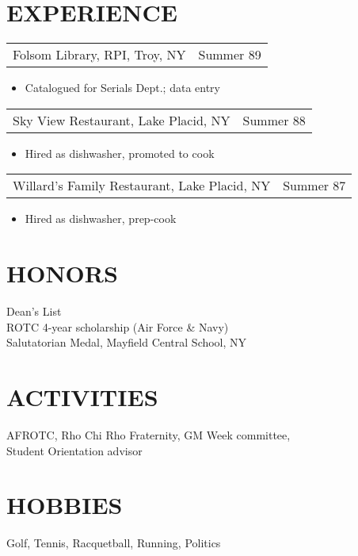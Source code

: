 \documentclass[margin]{res}
\begin{document}
\begin{resume}
\section{EXPERIENCE}      
                  \begin{tabular}{p{3in} r} %
                  Folsom Library, RPI, Troy, NY &  Summer 89 
                  \end{tabular}	
                   \begin{itemize} %
                    \item[] Catalogued for Serials Dept.; data entry 
		   \end{itemize} 
		 \begin{tabular}{p{3in} r}
                  Sky View Restaurant, Lake Placid, NY &  Summer 88 
                 \end{tabular}	
		  \begin{itemize}
                   \item[] Hired as dishwasher, promoted to cook 
                  \end{itemize}
                 \begin{tabular}{p{3in} r} %
                  Willard's Family Restaurant, Lake Placid, NY &  Summer 87
                 \end{tabular}
                  \begin{itemize}					        
                   \item[] Hired as dishwasher, prep-cook 
                  \end{itemize}
\section{HONORS} Dean's List \\
                 ROTC 4-year scholarship (Air Force \& Navy) \\
                 Salutatorian Medal, Mayfield Central School, NY 
 
\section{ACTIVITIES}
                AFROTC, Rho Chi Rho Fraternity, GM Week 
                committee, \\
                Student Orientation advisor 
 
\section{HOBBIES}         Golf, Tennis, Racquetball, Running, Politics 
 
\end{resume} 
\end{document}
